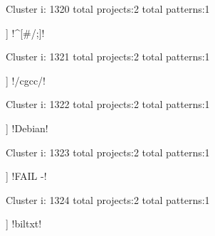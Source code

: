 Cluster i: 1320
total projects:2
total patterns:1
\begin{multicols}{1}
\begin{description}[noitemsep,topsep=0pt]
\item [[2] ] \cverb!^[#/;]!
\end{description}
\end{multicols}







Cluster i: 1321
total projects:2
total patterns:1
\begin{multicols}{1}
\begin{description}[noitemsep,topsep=0pt]
\item [[2] ] \cverb!/cgcc/!
\end{description}
\end{multicols}







Cluster i: 1322
total projects:2
total patterns:1
\begin{multicols}{1}
\begin{description}[noitemsep,topsep=0pt]
\item [[2] ] \cverb!Debian!
\end{description}
\end{multicols}







Cluster i: 1323
total projects:2
total patterns:1
\begin{multicols}{1}
\begin{description}[noitemsep,topsep=0pt]
\item [[2] ] \cverb!FAIL -!
\end{description}
\end{multicols}







Cluster i: 1324
total projects:2
total patterns:1
\begin{multicols}{1}
\begin{description}[noitemsep,topsep=0pt]
\item [[2] ] \cverb!biltxt!
\end{description}
\end{multicols}







